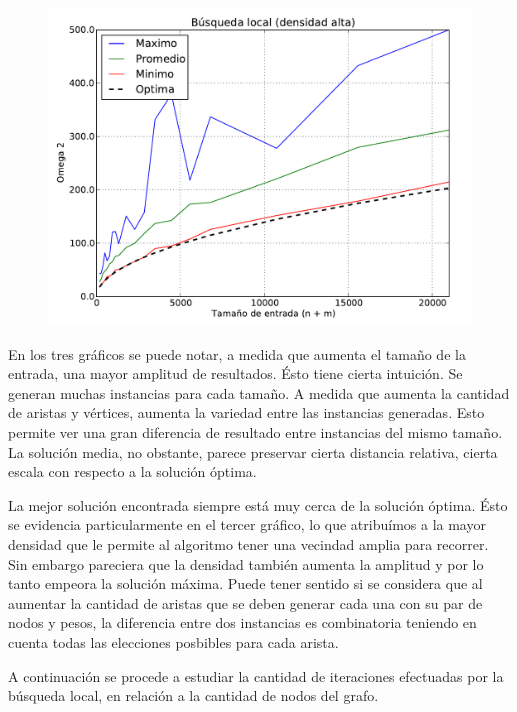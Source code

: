 \begin{figure}[H]
\begin{center}
\includegraphics[angle=0, scale=.75]{imagenes/calidad_local_search_2014-06-27_08-54-45.pdf}
\label{grafico local}
\end{center}
\end{figure}

En los tres gráficos se puede notar, a medida que aumenta el tamaño de la entrada, una mayor amplitud de resultados. Ésto tiene cierta intuición. 
Se generan muchas instancias para cada tamaño. A medida que aumenta la cantidad de aristas y vértices, aumenta la variedad entre las instancias
generadas. Esto permite ver una gran diferencia de resultado entre instancias del mismo tamaño.
La solución media, no obstante, parece preservar cierta distancia relativa, cierta escala con respecto a la solución óptima.

La mejor solución encontrada siempre está muy cerca de la solución óptima. Ésto se evidencia particularmente en el tercer gráfico, lo que
atribuímos a la mayor densidad que le permite al algoritmo tener una vecindad amplia para recorrer. Sin embargo pareciera que la densidad también aumenta la amplitud y por lo tanto empeora la solución máxima. Puede tener sentido si se considera que al aumentar la cantidad de aristas que se deben generar cada una con su par de nodos y pesos, la diferencia entre dos instancias es combinatoria teniendo en cuenta todas las elecciones posbibles para cada arista.

A continuación se procede a estudiar la cantidad de iteraciones efectuadas por la búsqueda local, en relación a la cantidad de nodos del grafo.

